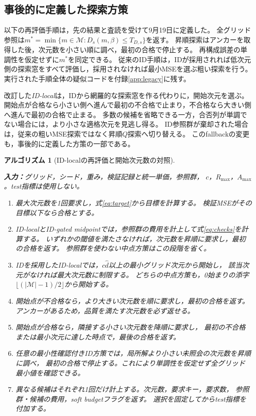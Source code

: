 \documentclass[11pt,a4paper]{ltjsarticle}
\newtheorem{Algorithm}{アルゴリズム}
\begin{document}
\subsection{事後的に定義した探索方策}\label{sec:replay}
以下の再評価手順は，先の結果と査読を受けて9月19日に定義した。
全グリッド参照は$m^*=\min\{m\in\mathcal M:D_s(m,\beta)\le T_{D,s}\}$を返す。
昇順探索はアンカーを取得した後，次元数を小さい順に調べ，最初の合格で停止する。
再構成誤差の単調性を仮定せずに$m^*$を同定できる。
従来のID手順は，IDが採用されれば低次元側の探索窓をすべて評価し，採用されなければ最小MSEを選ぶ粗い探索を行う。
実行された手順全体の疑似コードを付録\ref{app:legacy}に残す。

改訂した\emph{ID-local}は，IDから網羅的な探索窓を作る代わりに，開始次元を選ぶ。
開始点が合格なら小さい側へ進んで最初の不合格で止まり，不合格なら大きい側へ進んで最初の合格で止まる。
多数の候補を省略できる一方，合否列が単調でない場合には，より小さな適格次元を見逃し得る。
ID参照群が棄却された場合は，従来の粗いMSE探索ではなく昇順$Q$探索へ切り替える。
このfallbackの変更も，事後的に定義した方策の一部である。

\medskip\noindent\begin{minipage}{\linewidth}
\begin{Algorithm}[ID-localの再評価と開始次元数の対照]
\label{alg:replay}\normalfont\small\leavevmode\par\noindent
\textbf{入力：}グリッド，シード，重み，検証記録と統一単価，参照群，
$c$，$R_{\max}$，$A_{\max}$。test指標は使用しない。
\begin{enumerate}
\item 最大次元数を1回要求し，式\ref{eq:target}から目標を計算する。
検証MSEがその目標以下なら合格とする。
\item ID-localとID-gated midpointでは，参照群の費用を計上して式\ref{eq:checks}を計算する。
いずれかの閾値を満たさなければ，次元数を昇順に要求し，最初の合格を返す。
参照群を使わない中点方策はこの段階を省く。
\item IDを採用したID-localでは，$c\hat d$以上の最小グリッド次元から開始し，
該当次元がなければ最大次元数に制限する。
どちらの中点方策も，0始まりの添字$\lfloor(|\mathcal M|-1)/2\rfloor$から開始する。

\item 開始点が不合格なら，より大きい次元数を順に要求し，最初の合格を返す。
アンカーがあるため，品質を満たす次元数を必ず返せる。
\item 開始点が合格なら，隣接する小さい次元数を降順に要求し，
最初の不合格または最小次元に達した時点で，最後の合格を返す。
\item 任意の最小性確認付きID方策では，局所解より小さい未照会の次元数を昇順に調べ，
最初の合格で停止する。これにより単調性を仮定せず全グリッド最小値を確認できる。
\item 異なる候補はそれぞれ1回だけ計上する。次元数，要求キー，要求数，
参照群・候補の費用，soft budgetフラグを返す。
選択を固定してからtest指標を付加する。
\end{enumerate}
\end{Algorithm}
\end{minipage}\medskip
\end{document}
